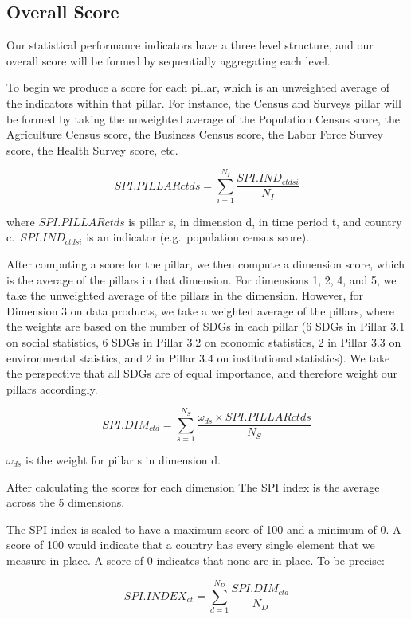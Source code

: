 \documentclass[
]{article}
\begin{document}
\hypertarget{overall-score}{%
\subsection{Overall Score}\label{overall-score}}

Our statistical performance indicators have a three level structure, and our overall score will be formed by sequentially aggregating each level.

To begin we produce a score for each pillar, which is an unweighted average of the indicators within that pillar. For instance, the Census and Surveys pillar will be formed by taking the unweighted average of the Population Census score, the Agriculture Census score, the Business Census score, the Labor Force Survey score, the Health Survey score, etc.

\[ SPI.PILLAR{ctds} = \sum_{i=1}^{N_I} \frac{SPI.IND_{ctdsi}}{N_I} \]

where \(SPI.PILLAR{ctds}\) is pillar s, in dimension d, in time period t, and country c.~\(SPI.IND_{ctdsi}\) is an indicator (e.g.~population census score).

After computing a score for the pillar, we then compute a dimension score, which is the average of the pillars in that dimension. For dimensions 1, 2, 4, and 5, we take the unweighted average of the pillars in the dimension. However, for Dimension 3 on data products, we take a weighted average of the pillars, where the weights are based on the number of SDGs in each pillar (6 SDGs in Pillar 3.1 on social statistics, 6 SDGs in Pillar 3.2 on economic statistics, 2 in Pillar 3.3 on environmental staistics, and 2 in Pillar 3.4 on institutional statistics). We take the perspective that all SDGs are of equal importance, and therefore weight our pillars accordingly.

\[ SPI.DIM_{ctd} = \sum_{s=1}^{N_S} \frac{\omega_{ds} \times SPI.PILLAR{ctds}}{N_S} \]

\(\omega_{ds}\) is the weight for pillar s in dimension d.

After calculating the scores for each dimension The SPI index is the average across the 5 dimensions.

The SPI index is scaled to have a maximum score of 100 and a minimum of 0. A score of 100 would indicate that a country has every single element that we measure in place. A score of 0 indicates that none are in place. To be precise:

\[ SPI.INDEX_{ct} = \sum_{d=1}^{N_D} \frac{SPI.DIM_{ctd}}{N_D} \]
\end{document}

